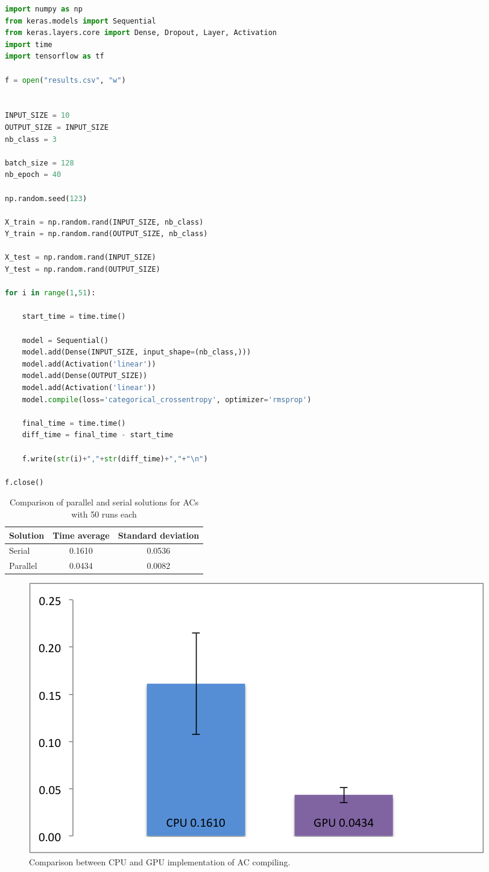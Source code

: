 \documentclass[UTF8]{ctexart}
\begin{document}
\begin{lstlisting}[language=python]
import numpy as np
from keras.models import Sequential
from keras.layers.core import Dense, Dropout, Layer, Activation
import time
import tensorflow as tf

f = open("results.csv", "w")


INPUT_SIZE = 10
OUTPUT_SIZE = INPUT_SIZE
nb_class = 3

batch_size = 128
nb_epoch = 40

np.random.seed(123)

X_train = np.random.rand(INPUT_SIZE, nb_class)
Y_train = np.random.rand(OUTPUT_SIZE, nb_class)

X_test = np.random.rand(INPUT_SIZE)
Y_test = np.random.rand(OUTPUT_SIZE)

for i in range(1,51):

    start_time = time.time()

    model = Sequential()
    model.add(Dense(INPUT_SIZE, input_shape=(nb_class,)))
    model.add(Activation('linear'))
    model.add(Dense(OUTPUT_SIZE))
    model.add(Activation('linear'))
    model.compile(loss='categorical_crossentropy', optimizer='rmsprop')

    final_time = time.time()
    diff_time = final_time - start_time

    f.write(str(i)+","+str(diff_time)+","+"\n")

f.close() 
\end{lstlisting}
 

\begin{table}[!h]
	\begin{center}
	\caption{Comparison of parallel and serial solutions for ACs with 50 runs each}
	  \begin{tabular}{ l | cc }
Solution & Time average & Standard deviation \\ \hline
Serial		& 	0.1610		&	0.0536	\\
Parallel 	& 	0.0434		&	0.0082
		\label{tab:bench_bns}
	\end{tabular}
  	\end{center}
\end{table}

\begin{figure}[H]
    \begin{center}
    	\includegraphics[width=0.7\columnwidth]{figures/graph.png}
		\caption{Comparison between CPU and GPU implementation of AC compiling.}
		\label{fig:deri}
    \end{center}
\end{figure}
\end{document}
